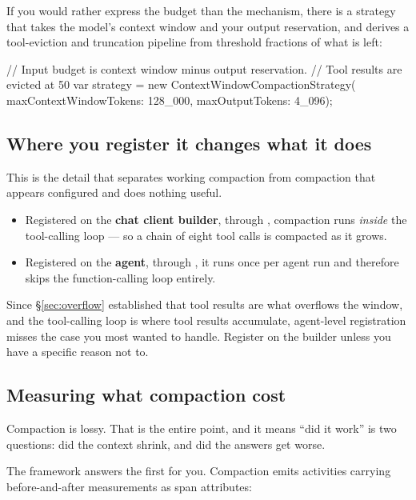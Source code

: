 If you would rather express the budget than the mechanism, there is a strategy
that takes the model's context window and your output reservation, and derives a
tool-eviction and truncation pipeline from threshold fractions of what is left:

\begin{csharp}[caption={Compaction expressed as a budget}, label={lst:compaction-budget}]
// Input budget is context window minus output reservation.
// Tool results are evicted at 50%
var strategy = new ContextWindowCompactionStrategy(
    maxContextWindowTokens: 128_000,
    maxOutputTokens: 4_096);
\end{csharp}

\subsection{Where you register it changes what it does}

This is the detail that separates working compaction from compaction that appears
configured and does nothing useful.

\begin{itemize}[leftmargin=1.4em]
\item Registered on the \textbf{chat client builder}, through
      , compaction runs \emph{inside} the tool-calling
      loop --- so a chain of eight tool calls is compacted as it grows.
\item Registered on the \textbf{agent}, through , it
      runs once per agent run and therefore skips the function-calling loop
      entirely.
\end{itemize}

Since \S\ref{sec:overflow} established that tool results are what overflows the
window, and the tool-calling loop is where tool results accumulate, agent-level
registration misses the case you most wanted to handle. Register on the builder
unless you have a specific reason not to.

\subsection{Measuring what compaction cost}

Compaction is lossy. That is the entire point, and it means ``did it work'' is
two questions: did the context shrink, and did the answers get worse.

The framework answers the first for you. Compaction emits activities carrying
before-and-after measurements as span attributes:

